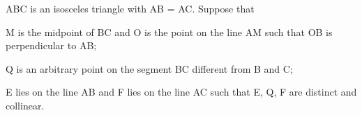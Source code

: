 
\item ABC is an isosceles triangle with AB = AC. Suppose that\\
\item M is the midpoint of BC and O is the point on the line AM such that OB is perpendicular to AB;
\item Q is an arbitrary point on the segment BC different from B and C;
\item E lies on the line AB and F lies on the line AC such that E, Q, F are distinct and collinear.
